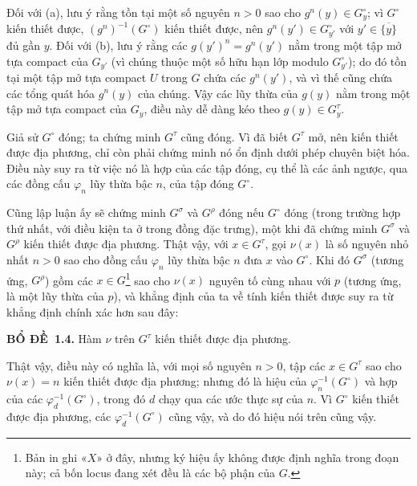 \documentclass[11pt,twoside,openany]{book}
\numberwithin{equation}{section}
\newcommand{\src}[1]{%
  \phantomsection\hypertarget{src:\fgasourceid:#1}{}%
  \marginpar{\raggedleft\footnotesize\sffamily #1}%
}
\newcommand{\fgasourceid}{unset}
\newcommand{\result}[2]{\par\medskip\noindent\textbf{#1\if\relax\detokenize{#2}\relax\else\ #2\fi.}\quad}
\begin{document}
Đối với (a), lưu ý rằng tồn tại một số nguyên $n>0$ sao cho
$g^n(y)\in G_y^\circ$; vì $G^\circ$ kiến thiết được,
$(g^n)^{-1}(G^\circ)$ kiến thiết được, nên
$g^n(y')\in G_{y'}^\circ$ với $y'\in\overline{\{y\}}$ đủ gần $y$. Đối với
(b), lưu ý rằng các $g(y')^n=g^n(y')$ nằm trong một tập mở tựa compact của
$G_{y'}$ (vì chúng thuộc một số hữu hạn lớp modulo $G_{y'}^\circ$); do đó tồn
tại một tập mở tựa compact $U$ trong $G$ chứa các $g^n(y')$, và vì thế cũng
chứa các tổng quát hóa $g^n(y)$ của chúng. Vậy các lũy thừa của $g(y)$ nằm
trong một tập mở tựa compact của $G_y$, điều này dễ dàng kéo theo
$g(y)\in G_y^\tau$.
\src{226}
Giả sử $G^\circ$ đóng; ta chứng minh $G^\tau$ cũng đóng. Vì đã biết
$G^\tau$ mở, nên kiến thiết được địa phương, chỉ còn phải chứng minh nó ổn
định dưới phép chuyên biệt hóa. Điều này suy ra từ việc nó là hợp của các tập
đóng, cụ thể là các ảnh ngược, qua các đồng cấu $\varphi_n$ lũy thừa bậc
$n$, của tập đóng $G^\circ$.

Cũng lập luận ấy sẽ chứng minh $G^\sigma$ và $G^\rho$ đóng nếu $G^\circ$
đóng (trong trường hợp thứ nhất, với điều kiện ta ở trong đồng đặc trưng), một
khi đã chứng minh $G^\sigma$ và $G^\rho$ kiến thiết được địa phương. Thật vậy,
với $x\in G^\tau$, gọi $\nu(x)$ là số nguyên nhỏ nhất $n>0$ sao cho đồng cấu
$\varphi_n$ lũy thừa bậc $n$ đưa $x$ vào $G^\circ$. Khi đó $G^\sigma$
(tương ứng, $G^\rho$) gồm các $x\in G$\footnote{Bản in ghi «$X$» ở đây,
nhưng ký hiệu ấy không được định nghĩa trong đoạn này; cả bốn locus đang xét đều là
các bộ phận của $G$.} sao cho $\nu(x)$ nguyên tố cùng nhau với $p$ (tương ứng,
là một lũy thừa của $p$), và khẳng định của ta về tính kiến thiết được suy ra
từ khẳng định chính xác hơn sau đây:

\result{BỔ ĐỀ}{1.4} Hàm $\nu$ trên $G^\tau$ kiến thiết được địa phương.

Thật vậy, điều này có nghĩa là, với mọi số nguyên $n>0$, tập các
$x\in G^\tau$ sao cho $\nu(x)=n$ kiến thiết được địa phương; nhưng đó là hiệu
của $\varphi_n^{-1}(G^\circ)$ và hợp của các
$\varphi_d^{-1}(G^\circ)$, trong đó $d$ chạy qua các ước thực sự của $n$. Vì
$G^\circ$ kiến thiết được địa phương, các $\varphi_d^{-1}(G^\circ)$ cũng vậy,
và do đó hiệu nói trên cũng vậy.
\end{document}
